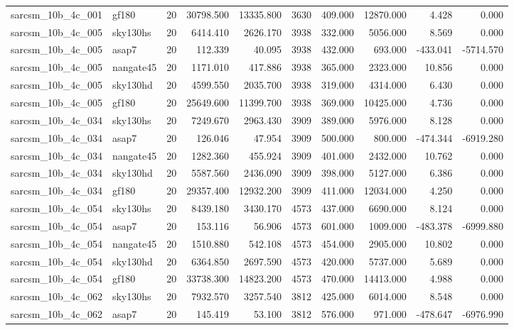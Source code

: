 \begin{tabular}{llrrrrrrrr}
sarcsm\_10b\_4c\_001 & gf180 & 20 & 30798.500 & 13335.800 & 3630 & 409.000 & 12870.000 & 4.428 & 0.000 \\
sarcsm\_10b\_4c\_005 & sky130hs & 20 & 6414.410 & 2626.170 & 3938 & 332.000 & 5056.000 & 8.569 & 0.000 \\
sarcsm\_10b\_4c\_005 & asap7 & 20 & 112.339 & 40.095 & 3938 & 432.000 & 693.000 & -433.041 & -5714.570 \\
sarcsm\_10b\_4c\_005 & nangate45 & 20 & 1171.010 & 417.886 & 3938 & 365.000 & 2323.000 & 10.856 & 0.000 \\
sarcsm\_10b\_4c\_005 & sky130hd & 20 & 4599.550 & 2035.700 & 3938 & 319.000 & 4314.000 & 6.430 & 0.000 \\
sarcsm\_10b\_4c\_005 & gf180 & 20 & 25649.600 & 11399.700 & 3938 & 369.000 & 10425.000 & 4.736 & 0.000 \\
sarcsm\_10b\_4c\_034 & sky130hs & 20 & 7249.670 & 2963.430 & 3909 & 389.000 & 5976.000 & 8.128 & 0.000 \\
sarcsm\_10b\_4c\_034 & asap7 & 20 & 126.046 & 47.954 & 3909 & 500.000 & 800.000 & -474.344 & -6919.280 \\
sarcsm\_10b\_4c\_034 & nangate45 & 20 & 1282.360 & 455.924 & 3909 & 401.000 & 2432.000 & 10.762 & 0.000 \\
sarcsm\_10b\_4c\_034 & sky130hd & 20 & 5587.560 & 2436.090 & 3909 & 398.000 & 5127.000 & 6.386 & 0.000 \\
sarcsm\_10b\_4c\_034 & gf180 & 20 & 29357.400 & 12932.200 & 3909 & 411.000 & 12034.000 & 4.250 & 0.000 \\
sarcsm\_10b\_4c\_054 & sky130hs & 20 & 8439.180 & 3430.170 & 4573 & 437.000 & 6690.000 & 8.124 & 0.000 \\
sarcsm\_10b\_4c\_054 & asap7 & 20 & 153.116 & 56.906 & 4573 & 601.000 & 1009.000 & -483.378 & -6999.880 \\
sarcsm\_10b\_4c\_054 & nangate45 & 20 & 1510.880 & 542.108 & 4573 & 454.000 & 2905.000 & 10.802 & 0.000 \\
sarcsm\_10b\_4c\_054 & sky130hd & 20 & 6364.850 & 2697.590 & 4573 & 420.000 & 5737.000 & 5.689 & 0.000 \\
sarcsm\_10b\_4c\_054 & gf180 & 20 & 33738.300 & 14823.200 & 4573 & 470.000 & 14413.000 & 4.988 & 0.000 \\
sarcsm\_10b\_4c\_062 & sky130hs & 20 & 7932.570 & 3257.540 & 3812 & 425.000 & 6014.000 & 8.548 & 0.000 \\
sarcsm\_10b\_4c\_062 & asap7 & 20 & 145.419 & 53.100 & 3812 & 576.000 & 971.000 & -478.647 & -6976.990 \\

\end{tabular}
